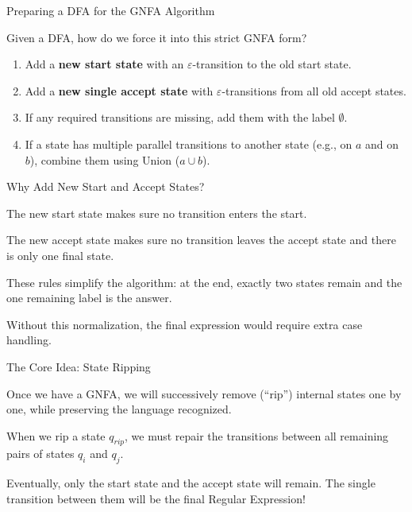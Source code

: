 \documentclass[10pt,aspectratio=169]{beamer}
\newcommand{\eps}{\varepsilon}
\begin{document}
\begin{frame}{Preparing a DFA for the GNFA Algorithm}

Given a DFA, how do we force it into this strict GNFA form?

\vspace{1em}

\begin{enumerate}
    \item Add a \textbf{new start state} with an $\eps$-transition to the old start state.
    \item Add a \textbf{new single accept state} with $\eps$-transitions from all old accept states.
    \item If any required transitions are missing, add them with the label $\emptyset$.
    \item If a state has multiple parallel transitions to another state (e.g., on $a$ and on $b$), combine them using Union ($a \cup b$).
\end{enumerate}

\end{frame}


\begin{frame}{Why Add New Start and Accept States?}

The new start state makes sure no transition enters the start.

\vspace{0.8em}
The new accept state makes sure no transition leaves the accept state and there is only one final state.

\vspace{0.8em}
These rules simplify the algorithm: at the end, exactly two states remain and the one remaining label is the answer.

\vspace{0.8em}
Without this normalization, the final expression would require extra case handling.

\end{frame}

\begin{frame}{The Core Idea: State Ripping}

Once we have a GNFA, we will successively remove (``rip'') internal states one by one, while preserving the language recognized.

\vspace{1em}

When we rip a state $q_{rip}$, we must repair the transitions between all remaining pairs of states $q_i$ and $q_j$.

\vspace{1em}

Eventually, only the start state and the accept state will remain. The single transition between them will be the final Regular Expression!

\end{frame}
\end{document}
